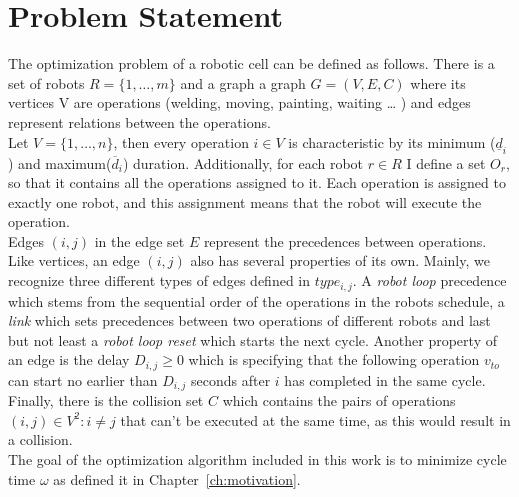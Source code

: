 \chapter{Problem Statement}
\label{ch:problem_statement}
\graphicspath{ {chapters/Problem_Statement/} }

The optimization problem of a robotic cell can be defined as follows.
There is a set of robots $R = \{ 1, \dots, m\} $ and a graph a graph $ G = (V, E, C) $ where its vertices V are operations (welding, moving, painting, waiting \dots
) and edges represent relations between the operations. \\

Let $V = \{1, \dots, n\}$, then every operation $i \in V$ is characteristic by its minimum ($\underline{d}_i$) and maximum($\overline{d}_i$) duration.
Additionally, for each robot $r \in R$ I define a set $O_r$, so that it contains all the operations assigned to it.
Each operation is assigned to exactly one robot, and this assignment means that the robot will execute the operation.\\

Edges $(i, j)$ in the edge set $E$ represent the precedences between operations. 
Like vertices, an edge $(i, j)$ also has several properties of its own. 
Mainly, we recognize three different types of edges defined in $type_{i,j}$. 
A \emph{robot loop} precedence which stems from the sequential order of the operations in the robots schedule, a \emph{link} which sets precedences between two operations of different robots and last but not least a \emph{robot loop reset} which starts the next cycle. 
Another property of an edge is the delay $D_{i,j} \geq 0$ which is specifying that the following operation $v_{to}$ can start no earlier than $D_{i,j}$ seconds after $i$ has completed in the same cycle. \\

Finally, there is the collision set $C$ which contains the pairs of operations $(i, j) \in V^2 : i \neq j$ that can't be executed at the same time, as this would result in a collision. \\

The goal of the optimization algorithm included in this work is to minimize cycle time $\omega$ as defined it in Chapter~\ref{ch:motivation}. \\

